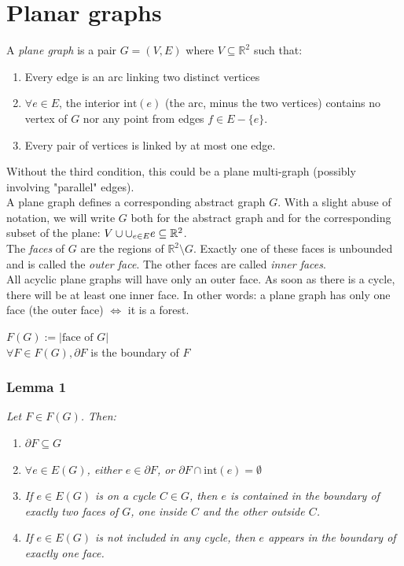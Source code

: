 
\chapter{Planar graphs}
		A \textit{plane graph} is a pair $G = (V,E)$ where $V \subseteq \mathbb{R}^2$ such that:
		\begin{enumerate}
			\item Every edge is an arc linking two distinct vertices
			\item $\forall e \in E$, the interior $\text{int}(e)$ (the arc, minus the two vertices) contains no vertex of $G$ nor any point from edges $f \in E - \{ e \}$.
			\item Every pair of vertices is linked by at most one edge.
		\end{enumerate}
		Without the third condition, this could be a plane multi-graph (possibly involving "parallel" edges).\\
		
		A plane graph defines a corresponding abstract graph $G$. With a slight abuse of notation, we will write $G$ both for the abstract graph and for the corresponding subset of the plane: $V \cup \Large{\cup_{e \in E}} e \subseteq \mathbb{R}^2$.\\
		
		The \textit{faces} of $G$ are the regions of $\mathbb{R}^2 \setminus G$. Exactly one of these faces is unbounded and is called the \textit{outer face}. The other faces are called \textit{inner faces}. \\
		
		All acyclic plane graphs will have only an outer face. As soon as there is a cycle, there will be at least one inner face. In other words: a plane graph has only one face (the outer face) $\iff$ it is a forest.

\bigskip
$F(G) := |\text{face of }G|$\\
$\forall F \in F(G), \partial F$ is the boundary of $F$

		\subsection{Lemma 1}
		\textit{Let $F \in F(G)$. Then:}
		\begin{enumerate}
			\item $\partial F \subseteq G$
			\item \textit{$\forall e \in E(G)$, either $e \in \partial F$, or $\partial F \cap \text{int}(e) = \emptyset$}
			\item \textit{If $e \in E(G)$ is on a cycle $C \in G$, then $e$ is contained in the boundary of exactly two faces of $G$, one inside $C$ and the other outside $C$.}
			\item \textit{If $e \in E(G)$ is not included in any cycle, then $e$ appears in the boundary of exactly one face.}
		\end{enumerate}
		
